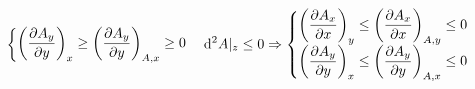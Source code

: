 \begin{principle}
\begin{tui}
\begin{align*}
\begin{cases}
        \left(\dfrac{\partial A_{y}}{\partial y}\right)_x
        \geq \left(\dfrac{\partial A_{y}}{\partial y}\right)_{A,x}\geq 0
    \end{cases}
\hfil
\mathrm{d}^2A|_z\leq 0\Rightarrow
\begin{cases}\left(\dfrac{\partial A_{x}}{\partial x}\right)_y
    \leq \left(\dfrac{\partial A_{x}}{\partial x}\right)_{A,y}\leq 0\\
    \left(\dfrac{\partial A_{y}}{\partial y}\right)_x
    \leq \left(\dfrac{\partial A_{y}}{\partial y}\right)_{A,x}\leq 0
\end{cases}
\end{align*}
\end{tui}
\end{principle}














\ifx\allfiles\undefined

\fi
